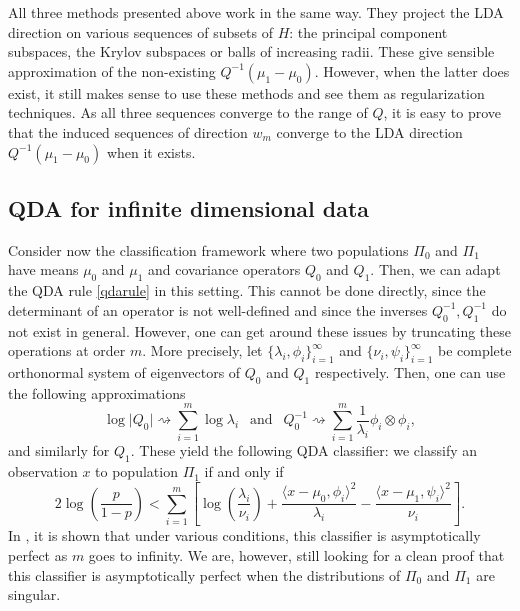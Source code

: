 \documentclass[10pt, a4paper]{report}
\theoremstyle{definition}
\theoremstyle{remark}
\begin{document}
All three methods presented above work in the same way. They project the LDA direction on various sequences of subsets of $H$: the principal component subspaces, the Krylov subspaces or balls of increasing radii. These give sensible approximation of the non-existing $Q^{-1}(\mu_1-\mu_0)$. However, when the latter does exist, it still makes sense to use these methods and see them as regularization techniques. As all three sequences converge to the range of $Q$, it is easy to prove that the induced sequences of direction $w_m$ converge to the LDA direction $Q^{-1}(\mu_1-\mu_0)$ when it exists.

\subsection{QDA for infinite dimensional data}\label{qdainf}
Consider now the classification framework where two populations $\Pi_0$ and $\Pi_1$ have means $\mu_0$ and $\mu_1$ and covariance operators $Q_0$ and $Q_1$. Then, we can adapt the QDA rule \ref{qdarule} in this setting. This cannot be done directly, since the determinant of an operator is not well-defined and since the inverses $Q_0^{-1},Q_1^{-1}$ do not exist in general. However, one can get around these issues by truncating these operations at order $m$. More precisely, let $\{\lambda_i,\phi_i\}_{i=1}^\infty$ and $\{\nu_i, \psi_i\}_{i=1}^\infty$ be complete orthonormal system of eigenvectors of $Q_0$ and $Q_1$ respectively. Then, one can use the following approximations 
$$\log \vert Q_0\vert \rightsquigarrow \sum_{i=1}^{m} \log \lambda_i \ \ \text{ and } \ \ Q_0^{-1} \rightsquigarrow \sum_{i=1}^{m} \frac{1}{\lambda_i} \phi_i \otimes \phi_i,$$
and similarly for $Q_1$. These yield the following QDA classifier: we classify an observation $x$ to population $\Pi_1$ if and only if
$$2\log\left(\frac{p}{1-p}\right) < \sum_{i=1}^{m} \left[\log\left(\frac{\lambda_i}{\nu_i}\right) + \frac{\langle x-\mu_0,\phi_i\rangle^2 }{\lambda_i} - \frac{\langle x-\mu_1,\psi_i\rangle^2 }{\nu_i}\right].$$ 
In \cite[Theorem 1]{DH1}, it is shown that under various conditions, this classifier is asymptotically perfect as $m$ goes to infinity. We are, however, still looking for a clean proof that this classifier is asymptotically perfect when the distributions of $\Pi_0$ and $\Pi_1$ are singular.
\end{document}
